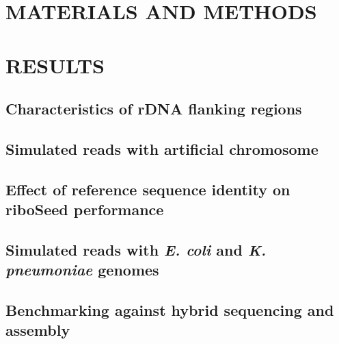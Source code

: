 \documentclass[a4,center,fleqn]{NAR}
\begin{document}


\section{MATERIALS AND METHODS}








\section{RESULTS}

\subsection*{Characteristics of rDNA flanking regions}



\subsection*{Simulated reads with artificial chromosome}








\subsection*{Effect of reference sequence identity on riboSeed performance}









\subsection*{Simulated reads with \textit{E. coli} and \textit{K. pneumoniae} genomes}



\subsection*{Benchmarking against hybrid sequencing and assembly}
\end{document}
